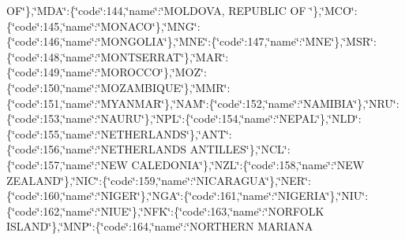 {O\-F\char`\"{}\},\char`\"{}M\-D\-A\char`\"{}\-:\{\char`\"{}code\char`\"{}\-:144,\char`\"{}name\char`\"{}\-:\char`\"{}M\-O\-L\-D\-O\-V\-A, R\-E\-P\-U\-B\-L\-I\-C O\-F \char`\"{}\},\char`\"{}M\-C\-O\char`\"{}\-:\{\char`\"{}code\char`\"{}\-:145,\char`\"{}name\char`\"{}\-:\char`\"{}M\-O\-N\-A\-C\-O\char`\"{}\},\char`\"{}M\-N\-G\char`\"{}\-:\{\char`\"{}code\char`\"{}\-:146,\char`\"{}name\char`\"{}\-:\char`\"{}M\-O\-N\-G\-O\-L\-I\-A\char`\"{}\},\char`\"{}M\-N\-E\char`\"{}\-:\{\char`\"{}code\char`\"{}\-:147,\char`\"{}name\char`\"{}\-:\char`\"{}M\-N\-E\char`\"{}\},\char`\"{}M\-S\-R\char`\"{}\-:\{\char`\"{}code\char`\"{}\-:148,\char`\"{}name\char`\"{}\-:\char`\"{}M\-O\-N\-T\-S\-E\-R\-R\-A\-T\char`\"{}\},\char`\"{}M\-A\-R\char`\"{}\-:\{\char`\"{}code\char`\"{}\-:149,\char`\"{}name\char`\"{}\-:\char`\"{}M\-O\-R\-O\-C\-C\-O\char`\"{}\},\char`\"{}M\-O\-Z\char`\"{}\-:\{\char`\"{}code\char`\"{}\-:150,\char`\"{}name\char`\"{}\-:\char`\"{}M\-O\-Z\-A\-M\-B\-I\-Q\-U\-E\char`\"{}\},\char`\"{}M\-M\-R\char`\"{}\-:\{\char`\"{}code\char`\"{}\-:151,\char`\"{}name\char`\"{}\-:\char`\"{}M\-Y\-A\-N\-M\-A\-R\char`\"{}\},\char`\"{}N\-A\-M\char`\"{}\-:\{\char`\"{}code\char`\"{}\-:152,\char`\"{}name\char`\"{}\-:\char`\"{}N\-A\-M\-I\-B\-I\-A\char`\"{}\},\char`\"{}N\-R\-U\char`\"{}\-:\{\char`\"{}code\char`\"{}\-:153,\char`\"{}name\char`\"{}\-:\char`\"{}N\-A\-U\-R\-U\char`\"{}\},\char`\"{}N\-P\-L\char`\"{}\-:\{\char`\"{}code\char`\"{}\-:154,\char`\"{}name\char`\"{}\-:\char`\"{}N\-E\-P\-A\-L\char`\"{}\},\char`\"{}N\-L\-D\char`\"{}\-:\{\char`\"{}code\char`\"{}\-:155,\char`\"{}name\char`\"{}\-:\char`\"{}N\-E\-T\-H\-E\-R\-L\-A\-N\-D\-S\char`\"{}\},\char`\"{}A\-N\-T\char`\"{}\-:\{\char`\"{}code\char`\"{}\-:156,\char`\"{}name\char`\"{}\-:\char`\"{}N\-E\-T\-H\-E\-R\-L\-A\-N\-D\-S A\-N\-T\-I\-L\-L\-E\-S\char`\"{}\},\char`\"{}N\-C\-L\char`\"{}\-:\{\char`\"{}code\char`\"{}\-:157,\char`\"{}name\char`\"{}\-:\char`\"{}N\-E\-W C\-A\-L\-E\-D\-O\-N\-I\-A\char`\"{}\},\char`\"{}N\-Z\-L\char`\"{}\-:\{\char`\"{}code\char`\"{}\-:158,\char`\"{}name\char`\"{}\-:\char`\"{}N\-E\-W Z\-E\-A\-L\-A\-N\-D\char`\"{}\},\char`\"{}N\-I\-C\char`\"{}\-:\{\char`\"{}code\char`\"{}\-:159,\char`\"{}name\char`\"{}\-:\char`\"{}N\-I\-C\-A\-R\-A\-G\-U\-A\char`\"{}\},\char`\"{}N\-E\-R\char`\"{}\-:\{\char`\"{}code\char`\"{}\-:160,\char`\"{}name\char`\"{}\-:\char`\"{}N\-I\-G\-E\-R\char`\"{}\},\char`\"{}N\-G\-A\char`\"{}\-:\{\char`\"{}code\char`\"{}\-:161,\char`\"{}name\char`\"{}\-:\char`\"{}N\-I\-G\-E\-R\-I\-A\char`\"{}\},\char`\"{}N\-I\-U\char`\"{}\-:\{\char`\"{}code\char`\"{}\-:162,\char`\"{}name\char`\"{}\-:\char`\"{}N\-I\-U\-E\char`\"{}\},\char`\"{}N\-F\-K\char`\"{}\-:\{\char`\"{}code\char`\"{}\-:163,\char`\"{}name\char`\"{}\-:\char`\"{}N\-O\-R\-F\-O\-L\-K I\-S\-L\-A\-N\-D\char`\"{}\},\char`\"{}M\-N\-P\char`\"{}\-:\{\char`\"{}code\char`\"{}\-:164,\char`\"{}name\char`\"{}\-:\char`\"{}N\-O\-R\-T\-H\-E\-R\-N M\-A\-R\-I\-A\-N\-A }
